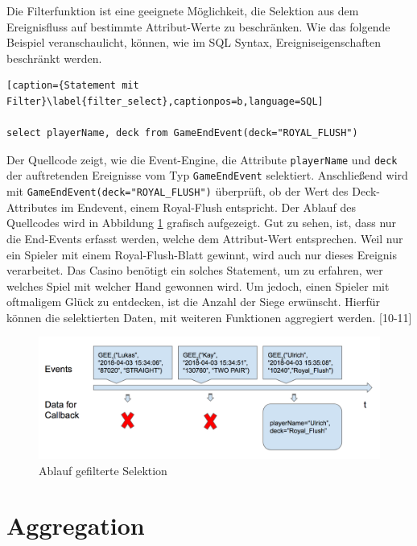 Die Filterfunktion ist eine geeignete Möglichkeit, die Selektion aus dem Ereignisfluss auf bestimmte Attribut-Werte zu beschränken. Wie das folgende Beispiel veranschaulicht, können, wie im SQL Syntax, Ereigniseigenschaften beschränkt werden.
\begin{lstlisting}[caption={Statement mit Filter}\label{filter_select},captionpos=b,language=SQL]

select playerName, deck from GameEndEvent(deck="ROYAL_FLUSH")

\end{lstlisting}
Der Quellcode zeigt, wie die Event-Engine, die Attribute \texttt{playerName} und \texttt{deck} der auftretenden Ereignisse vom Typ \texttt{GameEndEvent} selektiert. Anschließend wird mit \texttt{GameEndEvent(deck="ROYAL\_FLUSH")} überprüft, ob der Wert des Deck-Attributes im Endevent, einem Royal-Flush entspricht.
Der Ablauf des Quellcodes wird in Abbildung \ref{filter_select_img} grafisch aufgezeigt. Gut zu sehen, ist, dass nur die End-Events erfasst werden, welche dem Attribut-Wert entsprechen. Weil nur ein Spieler mit einem Royal-Flush-Blatt gewinnt, wird auch nur dieses Ereignis verarbeitet.
Das Casino benötigt ein solches Statement, um zu erfahren, wer welches Spiel mit welcher Hand gewonnen wird. Um jedoch, einen Spieler mit oftmaligem Glück zu entdecken, ist die Anzahl der Siege erwünscht. Hierfür können die selektierten Daten, mit weiteren Funktionen aggregiert werden.
\cite{EsperRef2018}[10-11]
\begin{figure}[ht]
	\centering
	\includegraphics[width=\textwidth,height=\textheight, keepaspectratio]{images/statement_basic_filter.png}
	\caption{Ablauf gefilterte Selektion}
	\label{filter_select_img}
\end{figure}

\section{Aggregation}

